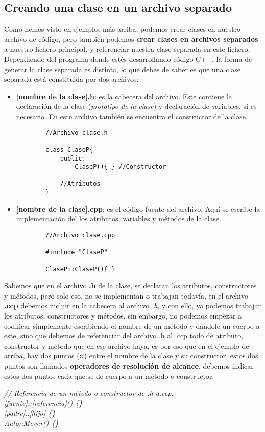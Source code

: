 \subsection{Creando una clase en un archivo separado}
\hspace{0.55cm}Como hemos visto en ejemplos más arriba, podemos crear clases en nuestro archivo de código, pero también podemos \textbf{crear clases en archivos separados} a nuestro fichero principal, y referenciar nuestra clase separada en este fichero. Dependiendo del programa donde estés desarrollando código C++, la forma de generar la clase separada es distinta, lo que debes de saber es que una clase separada está constituida por dos archivos:
\begin{itemize}
    \item \textbf{[nombre de la clase].h}: es la cabecera del archivo. Este contiene la declaración de la clase (\textit{prototipo de la clase}) y declaración de variables, si es necesario. En este archivo también se encuentra el constructor de la clase.
    \begin{lstlisting}
        //Archivo clase.h
        
        class ClaseP{
            public:
                ClaseP(){ } //Constructor
            
            //Atributos
        }
    \end{lstlisting}
    \item \textbf{[nombre de la clase].cpp}: es el código fuente del archivo. Aquí se escribe la implementación del los atributos, variables y métodos de la clase.
    \begin{lstlisting}
        //Archivo clase.cpp
        
        #include "ClaseP"
        
        ClaseP::ClaseP(){ }
    \end{lstlisting}
\end{itemize}

Sabemos que en el archivo \textbf{.h} de la clase, se declaran los atributos, constructores y métodos, pero solo eso, no se implementan o trabajan todavía, en el archivo \textbf{.ccp} debemos incluir en la cabecera al archivo \textit{.h}, y con ello, ya podemos trabajar los atributos, constructores y métodos, sin embargo, no podemos empezar a codificar simplemente escribiendo el nombre de un método y dándole un cuerpo a este, sino que debemos de referenciar del archivo .h al .ccp todo de atributo, constructor y método que en ese archivo haya, es por eso que en el ejemplo de arriba, hay dos puntos (\textbf{::}) entre el nombre de la clase y su constructor, estos dos puntos son llamados \textbf{operadores de resolución de alcance}, debemos indicar estos dos puntos cada que se dé cuerpo a un método o constructor.
\begin{center}
    \textit{// Referencia de un método o constructor de .h a.ccp.} \\
    \textit{[fuente]::[referencia]() \{\}} \\
    \textit{[padre]::[hijo] \{\}} \\
    \textit{Auto::Mover() \{\}}
\end{center}


